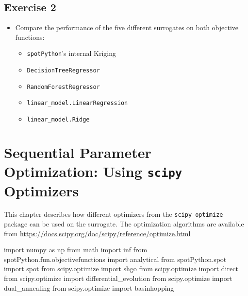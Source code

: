 \documentclass[
  letterpaper,
  DIV=11,
  numbers=noendperiod]{scrreprt}
\newenvironment{Shaded}{\begin{snugshade}}{\end{snugshade}}
\newcommand{\ImportTok}[1]{\textcolor[rgb]{0.00,0.46,0.62}{#1}}
\newcommand{\NormalTok}[1]{\textcolor[rgb]{0.00,0.23,0.31}{#1}}
\providecommand{\tightlist}{%
  \setlength{\itemsep}{0pt}\setlength{\parskip}{0pt}}\usepackage{longtable,booktabs,array}
\begin{document}
\hypertarget{exercise-2}{%
\section{Exercise 2}\label{exercise-2}}

\begin{itemize}
\item
  Compare the performance of the five different surrogates on both
  objective functions:

  \begin{itemize}
  \tightlist
  \item
    \texttt{spotPython}'s internal Kriging
  \item
    \texttt{DecisionTreeRegressor}
  \item
    \texttt{RandomForestRegressor}
  \item
    \texttt{linear\_model.LinearRegression}
  \item
    \texttt{linear\_model.Ridge}
  \end{itemize}
\end{itemize}

\hypertarget{sec-scipy-optimizers}{%
\chapter{\texorpdfstring{Sequential Parameter Optimization: Using
\texttt{scipy}
Optimizers}{Sequential Parameter Optimization: Using scipy Optimizers}}\label{sec-scipy-optimizers}}

This chapter describes how different optimizers from the
\texttt{scipy\ optimize} package can be used on the surrogate. The
optimization algorithms are available from
\url{https://docs.scipy.org/doc/scipy/reference/optimize.html}

\begin{Shaded}
\begin{Highlighting}[]
\ImportTok{import}\NormalTok{ numpy }\ImportTok{as}\NormalTok{ np}
\ImportTok{from}\NormalTok{ math }\ImportTok{import}\NormalTok{ inf}
\ImportTok{from}\NormalTok{ spotPython.fun.objectivefunctions }\ImportTok{import}\NormalTok{ analytical}
\ImportTok{from}\NormalTok{ spotPython.spot }\ImportTok{import}\NormalTok{ spot}
\ImportTok{from}\NormalTok{ scipy.optimize }\ImportTok{import}\NormalTok{ shgo}
\ImportTok{from}\NormalTok{ scipy.optimize }\ImportTok{import}\NormalTok{ direct}
\ImportTok{from}\NormalTok{ scipy.optimize }\ImportTok{import}\NormalTok{ differential\_evolution}
\ImportTok{from}\NormalTok{ scipy.optimize }\ImportTok{import}\NormalTok{ dual\_annealing}
\ImportTok{from}\NormalTok{ scipy.optimize }\ImportTok{import}\NormalTok{ basinhopping}
\end{Highlighting}
\end{Shaded}
\end{document}
